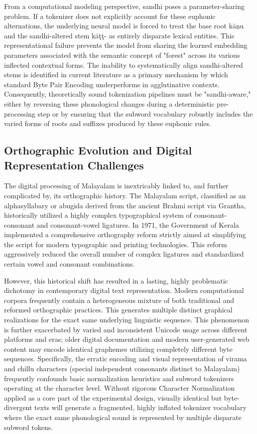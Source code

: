 \documentclass[12pt]{article}
\begin{document}
From a computational modeling perspective, sandhi poses a parameter-sharing problem. If a tokenizer does not explicitly account for these euphonic alternations, the underlying neural model is forced to treat the base root kāņu and the sandhi-altered stem kāţţ- as entirely disparate lexical entities. This representational failure prevents the model from sharing the learned embedding parameters associated with the semantic concept of "forest" across its various inflected contextual forms. The inability to systematically align sandhi-altered stems is identified in current literature as a primary mechanism by which standard Byte Pair Encoding underperforms in agglutinative contexts. Consequently, theoretically sound tokenization pipelines must be "sandhi-aware," either by reversing these phonological changes during a deterministic pre-processing step or by ensuring that the subword vocabulary robustly includes the varied forms of roots and suffixes produced by these euphonic rules.

\subsection{Orthographic Evolution and Digital Representation Challenges }

The digital processing of Malayalam is inextricably linked to, and further complicated by, its orthographic history. The Malayalam script, classified as an alphasyllabary or abugida derived from the ancient Brahmi script via Grantha, historically utilized a highly complex typographical system of consonant-consonant and consonant-vowel ligatures. In 1971, the Government of Kerala implemented a comprehensive orthography reform strictly aimed at simplifying the script for modern typographic and printing technologies.\cite{kerala1971scriptreform} This reform aggressively reduced the overall number of complex ligatures and standardized certain vowel and consonant combinations. 

However, this historical shift has resulted in a lasting, highly problematic dichotomy in contemporary digital text representation. Modern computational corpora frequently contain a heterogeneous mixture of both traditional and reformed orthographic practices. This generates multiple distinct graphical realizations for the exact same underlying linguistic sequence. This phenomenon is further exacerbated by varied and inconsistent Unicode usage across different platforms and eras; older digital documentation and modern user-generated web content may encode identical graphemes utilizing completely different byte sequences. Specifically, the erratic encoding and visual representation of virama and chillu characters (special independent consonants distinct to Malayalam) frequently confounds basic normalization heuristics and subword tokenizers operating at the character level. Without rigorous Character Normalization applied as a core part of the experimental design, visually identical but byte-divergent texts will generate a fragmented, highly inflated tokenizer vocabulary where the exact same phonological sound is represented by multiple disparate subword tokens. 
\end{document}
